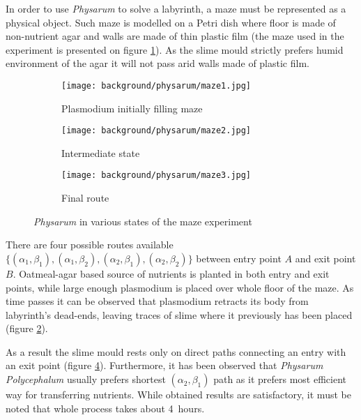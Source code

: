 In order to use \textit{Physarum} to solve a labyrinth, a maze must be represented as a physical object. Such maze is modelled on a Petri dish where floor is made of non-nutrient agar and walls are made of thin plastic film (the maze used in the experiment is presented on figure \ref{figure:bp_maze_initial}). As the slime mould strictly prefers humid environment of the agar it will not pass arid walls made of plastic film. 

\begin{figure}
  \centering
  \begin{subfigure}{0.45\textwidth}
    \centering
    \texttt{[image: background/physarum/maze1.jpg]}
    \caption{Plasmodium initially filling maze}
    \label{figure:bp_maze_initial}
  \end{subfigure}
  \begin{subfigure}{0.45\textwidth}
    \centering
    \texttt{[image: background/physarum/maze2.jpg]}
    \caption{Intermediate state}
    \label{figure:bp_maze_intermediate}
  \end{subfigure}
  \begin{subfigure}{0.45\textwidth}
    \centering
    \texttt{[image: background/physarum/maze3.jpg]}
    \caption{Final route}
    \label{figure:bp_maze_final}
  \end{subfigure}
  \caption{\textit{Physarum} in various states of the maze experiment \cite{nakagaki2000intelligence}}
\end{figure}

There are four possible routes available $\{(\alpha_1,\beta_1), (\alpha_1,\beta_2), (\alpha_2,\beta_1), (\alpha_2,\beta_2)\}$ between entry point $A$ and exit point $B$. Oatmeal-agar based source of nutrients is planted in both entry and exit points, while large enough plasmodium is placed over whole floor of the maze. As time passes it can be observed that plasmodium retracts its body from labyrinth's dead-ends, leaving traces of slime where it previously has been placed (figure \ref{figure:bp_maze_intermediate}). 

As a result the slime mould rests only on direct paths connecting an entry with an exit point (figure \ref{figure:bp_maze_final}). Furthermore, it has been observed that \textit{Physarum Polycephalum} usually prefers shortest $(\alpha_2,\beta_1)$ path as it prefers most efficient way for transferring nutrients. While obtained results are satisfactory, it must be noted that whole process takes about 4~hours. 


